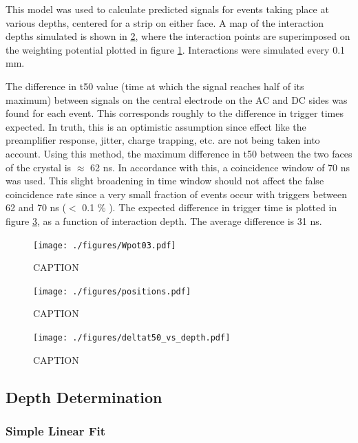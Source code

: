 This model was used to calculate predicted signals for events taking place at various depths, centered for a strip on either face. A map of the interaction depths simulated is shown in \ref{positions}, where the interaction points are superimposed on the weighting potential plotted in figure \ref{wpot}. Interactions were simulated every 0.1 mm.

The difference in t50 value (time at which the signal reaches half of its maximum) between signals on the central electrode on the AC and DC sides was found for each event. This corresponds roughly to the difference in trigger times expected. In truth, this is an optimistic assumption since effect like the preamplifier response, jitter, charge trapping, etc. are not being taken into account. Using this method, the maximum difference in t50 between the two faces of the crystal is $\approx$ 62 ns. In accordance with this, a coincidence window of 70 ns was used. This slight broadening in time window should not affect the false coincidence rate since a very small fraction of events occur with triggers between 62 and 70 ns ($<$ 0.1 $\%$ ). The expected difference in trigger time is plotted in figure \ref{t50depth}, as a function of interaction depth. The average difference is 31 ns. 

\begin{figure}
\begin{centering}
\texttt{[image: ./figures/Wpot03.pdf]}
\caption{CAPTION}
\label{wpot}
\end{centering}
\end{figure}

\begin{figure}
\begin{centering}
\texttt{[image: ./figures/positions.pdf]}
\caption{CAPTION}
\label{positions}
\end{centering}
\end{figure}

\begin{figure}
\begin{centering}
\texttt{[image: ./figures/deltat50\_vs\_depth.pdf]}
\caption{CAPTION}
\label{t50depth}
\end{centering}
\end{figure}

\subsection*{Depth Determination}

\subsubsection*{Simple Linear Fit}

